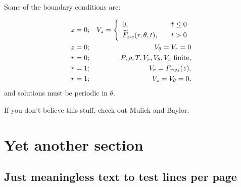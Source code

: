 Some of the boundary conditions are:

\begin{eqnarray}
  z=0; && V_z = \twochoices
	{0, && t\leq0}
	{\widetilde{F}_{zw}(r,\theta,t), && t>0}
						\label{eq:endwall} \\
  z=0; && V_{\theta}=V_r=0			\label{eq:endnoslip} \\
  r=0; && P,\rho,T,V_r,\vth,V_z~\mbox{finite},	\label{eq:centerline} \\
  r=1; && V_r= F_{rws}(z),			\label{eq:injection} \\
  r=1; && V_z=\vth =0,				\label{eq:sidenoslip}
\end{eqnarray}
and solutions must be periodic in $\theta$.

If you don't believe this stuff, check out
Mulick\cite{mulick} and Baylor\cite{baylor}.


\section{Yet another section}

\subsection{
	Just meaningless text to test lines per page
	\label{ss}}


